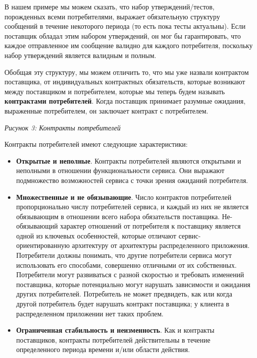 \documentclass[11pt]{article}
\providecommand{\tightlist}{%
      \setlength{\itemsep}{0pt}\setlength{\parskip}{0pt}}
\begin{document}
В нашем примере мы можем сказать, что набор утверждений/тестов,
порожденных всеми потребителями, выражает обязательную структуру
сообщений в течение некоторого периода (то есть пока тесты актуальны).
Если поставщик обладал этим набором утверждений, он мог бы
гарантировать, что каждое отправленное им сообщение валидно для каждого
потребителя, поскольку набор утверждений является валидным и полным.

Обобщая эту структуру, мы можем отличить то, что мы уже назвали
контрактом поставщика, от индивидуальных контрактных обязательств,
которые возникают между поставщиком и потребителем, которые мы теперь
будем называть \textbf{контрактами потребителей}. Когда поставщик
принимает разумные ожидания, выраженные потребителем, он заключает
контракт с потребителем.

\emph{Рисунок 3: Контракты потребителей}

Контракты потребителей имеют следующие характеристики:

\begin{itemize}
\tightlist
\item
  \textbf{Открытые и неполные}. Контракты потребителей являются
  открытыми и неполными в отношении функциональности сервиса. Они
  выражают подмножество возможностей сервиса с точки зрения ожиданий
  потребителя.
\item
  \textbf{Множественные и не обязывающие}. Число контрактов потребителей
  пропорционально числу потребителей сервиса, и каждый из них не
  является обязывающим в отношении всего набора обязательств поставщика.
  Не-обязывающий характер отношений от потребителя к поставщику является
  одной из ключевых особенностей, которые отличают
  сервис-ориентированную архитектуру от архитектуры распределенного
  приложения. Потребители должны понимать, что другие потребители
  сервиса могут использовать его способами, совершенно отличными от их
  собственных. Потребители могут развиваться с разной скоростью и
  требовать изменений поставщика, которые потенциально могут нарушать
  зависимости и ожидания других потребителей. Потребитель не может
  предвидеть, как или когда другой потребитель будет нарушать контракт
  поставщика; у клиента в распределенном приложении нет таких проблем.
\item
  \textbf{Ограниченная стабильность и неизменность}. Как и контракты
  поставщиков, контракты потребителей действительны в течение
  определенного периода времени и/или области действия.
\end{itemize}
\end{document}
